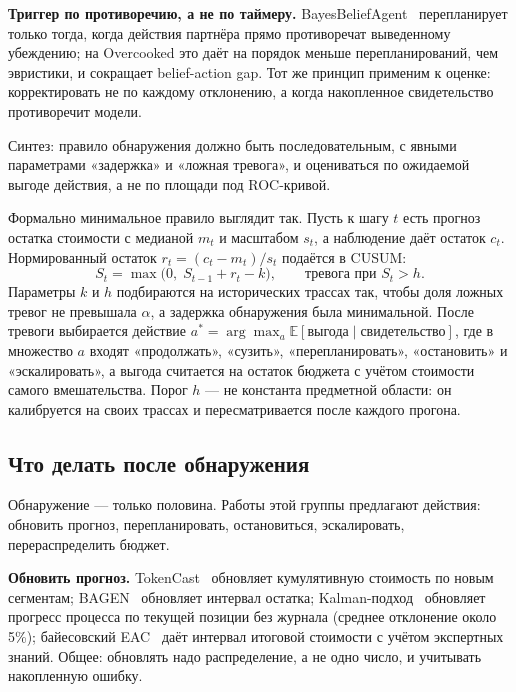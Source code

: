 \documentclass[11pt,a4paper]{article}
\begin{document}
\textbf{Триггер по противоречию, а не по таймеру.}
BayesBeliefAgent~\cite{goel2026bayes} перепланирует только тогда, когда
действия партнёра прямо противоречат выведенному убеждению; на Overcooked
это даёт на порядок меньше перепланирований, чем эвристики, и сокращает
belief-action gap. Тот же принцип применим к оценке: корректировать не по
каждому отклонению, а когда накопленное свидетельство противоречит
модели.

Синтез: правило обнаружения должно быть последовательным, с явными
параметрами «задержка» и «ложная тревога», и оцениваться по ожидаемой
выгоде действия, а не по площади под ROC-кривой.

Формально минимальное правило выглядит так. Пусть к шагу $t$ есть прогноз
остатка стоимости с медианой $m_t$ и масштабом $s_t$, а наблюдение даёт
остаток $c_t$. Нормированный остаток $r_t = (c_t - m_t)/s_t$ подаётся в
CUSUM:
\begin{equation}
  S_t = \max\bigl(0,\; S_{t-1} + r_t - k\bigr), \qquad
  \text{тревога при } S_t > h .
\end{equation}
Параметры $k$ и $h$ подбираются на исторических трассах так, чтобы доля
ложных тревог не превышала $\alpha$, а задержка обнаружения была
минимальной. После тревоги выбирается действие
$a^\ast = \arg\max_a \mathbb{E}[\text{выгода} \mid \text{свидетельство}]$,
где в множество $a$ входят «продолжать», «сузить», «перепланировать»,
«остановить» и «эскалировать», а выгода считается на остаток бюджета с
учётом стоимости самого вмешательства. Порог $h$ — не константа
предметной области: он калибруется на своих трассах и пересматривается
после каждого прогона.

\subsection{Что делать после обнаружения}

Обнаружение — только половина. Работы этой группы предлагают действия:
обновить прогноз, перепланировать, остановиться, эскалировать,
перераспределить бюджет.

\textbf{Обновить прогноз.}
TokenCast~\cite{ouyang2026tokencast} обновляет кумулятивную стоимость по
новым сегментам; BAGEN~\cite{lin2026bagen} обновляет интервал остатка;
Kalman-подход~\cite{arnold2021kalman} обновляет прогресс процесса по
текущей позиции без журнала (среднее отклонение около 5\%);
байесовский EAC~\cite{caron2012bayesian} даёт интервал итоговой стоимости
с учётом экспертных знаний. Общее: обновлять надо распределение, а не
одно число, и учитывать накопленную ошибку.
\end{document}
